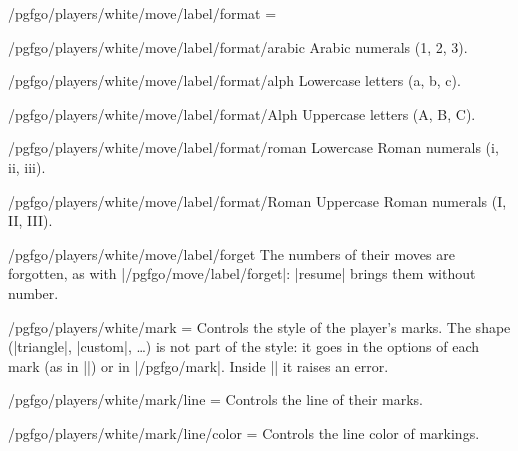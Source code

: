 \begin{goban}[9, stone = {radius = 4pt}, mark = {line = {color = red}}]
\begin{key}{/pgfgo/players/white/move/label/format = }
\begin{codeexample}[width=4cm]
		\begin{goban}[3]
		\end{goban}
	\end{codeexample}
\end{key}

\begin{key}{/pgfgo/players/white/move/label/format/arabic}
	Arabic numerals (1, 2, 3).
\end{key}

\begin{key}{/pgfgo/players/white/move/label/format/alph}
	Lowercase letters (a, b, c).
\end{key}

\begin{key}{/pgfgo/players/white/move/label/format/Alph}
	Uppercase letters (A, B, C).
\end{key}

\begin{key}{/pgfgo/players/white/move/label/format/roman}
	Lowercase Roman numerals (i, ii, iii).
\end{key}

\begin{key}{/pgfgo/players/white/move/label/format/Roman}
	Uppercase Roman numerals (I, II, III).
\end{key}

\begin{key}{/pgfgo/players/white/move/label/forget}
	The numbers of their moves are forgotten, as with |/pgfgo/move/label/forget|: |resume| brings them without number.
\end{key}

\begin{key}{/pgfgo/players/white/mark = }
	Controls the style of the player's marks. The shape (|triangle|, |custom|, \dots) is not part of the style: it goes in the options of each mark (as in ||) or in |/pgfgo/mark|. Inside || it raises an error.
\end{key}

\begin{key}{/pgfgo/players/white/mark/line = }
	Controls the line of their marks.
\end{key}

\begin{key}{/pgfgo/players/white/mark/line/color = }
	Controls the line color of markings.
	\begin{codeexample}[width=4cm]


\end{codeexample}
\end{key}
\end{goban}
